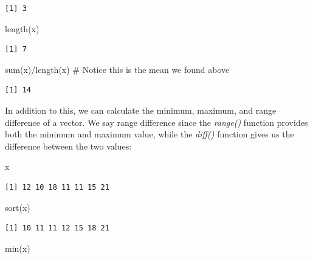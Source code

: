 \documentclass[
  letterpaper,
  DIV=11,
  numbers=noendperiod]{scrreprt}
\newenvironment{Shaded}{\begin{snugshade}}{\end{snugshade}}
\newcommand{\CommentTok}[1]{\textcolor[rgb]{0.37,0.37,0.37}{#1}}
\newcommand{\FunctionTok}[1]{\textcolor[rgb]{0.28,0.35,0.67}{#1}}
\newcommand{\NormalTok}[1]{\textcolor[rgb]{0.00,0.23,0.31}{#1}}
\newcommand{\SpecialCharTok}[1]{\textcolor[rgb]{0.37,0.37,0.37}{#1}}
\begin{document}
\begin{verbatim}
[1] 3
\end{verbatim}

\begin{Shaded}
\begin{Highlighting}[]
\FunctionTok{length}\NormalTok{(x)}
\end{Highlighting}
\end{Shaded}

\begin{verbatim}
[1] 7
\end{verbatim}

\begin{Shaded}
\begin{Highlighting}[]
\FunctionTok{sum}\NormalTok{(x)}\SpecialCharTok{/}\FunctionTok{length}\NormalTok{(x) }\CommentTok{\# Notice this is the mean we found above}
\end{Highlighting}
\end{Shaded}

\begin{verbatim}
[1] 14
\end{verbatim}

In addition to this, we can calculate the minimum, maximum, and range
difference of a vector. We say range difference since the \emph{range()}
function provides both the minimum and maximum value, while the
\emph{diff()} function gives us the difference between the two values:

\begin{Shaded}
\begin{Highlighting}[]
\NormalTok{x}
\end{Highlighting}
\end{Shaded}

\begin{verbatim}
[1] 12 10 18 11 11 15 21
\end{verbatim}

\begin{Shaded}
\begin{Highlighting}[]
\FunctionTok{sort}\NormalTok{(x)}
\end{Highlighting}
\end{Shaded}

\begin{verbatim}
[1] 10 11 11 12 15 18 21
\end{verbatim}

\begin{Shaded}
\begin{Highlighting}[]
\FunctionTok{min}\NormalTok{(x)}
\end{Highlighting}
\end{Shaded}
\end{document}
